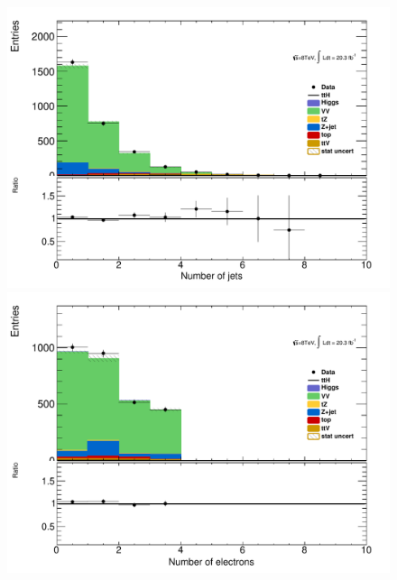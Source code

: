 \begin{figure}[!htbp]
  \begin{minipage}[h]{0.5\textwidth}
    \centering \includegraphics[width=\textwidth]{figs/WZ/plotCand_3lep_VV_NJet}
  \end{minipage}\hfill
  \begin{minipage}[h]{0.5\textwidth}
    \centering \includegraphics[width=\textwidth]{figs/WZ/plotCand_3lep_VV_NElec}
  \end{minipage}\hfill
  \begin{minipage}[h]{0.5\textwidth}

\end{minipage}
\end{figure}
